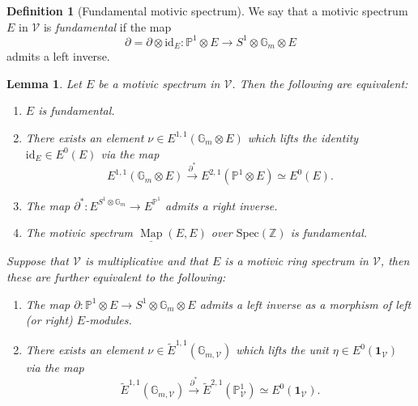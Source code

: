 \documentclass{amsart}
\theoremstyle{plain}
\newtheorem{lemma}[theorem]{Lemma}
\theoremstyle{definition}
\newtheorem{definition}[theorem]{Definition}
\theoremstyle{remark}
\numberwithin{equation}{theorem}
\newcommand{\mbb}[1]{\mathbb{#1}}
\newcommand{\mbf}[1]{\mathbf{#1}}
\newcommand{\Spec}{\mathrm{Spec}}
\newcommand{\V}{\mathcal{V}}
\newcommand{\id}{\mathrm{id}}
\newcommand{\Map}{\operatorname{Map}}
\newcommand{\intMap}{\underline{\Map}}
\begin{document}
\begin{definition}[Fundamental motivic spectrum]\label{def:FMS}
We say that a motivic spectrum $E$ in $\V$ is \textit{fundamental} if the map
\[
	\partial=\partial\otimes\id_E \colon \mbb{P}^1\otimes E \to S^1\otimes\mbb{G}_m\otimes E
\]
admits a left inverse.
\end{definition}

\begin{lemma}\label{lem:FMS}
Let $E$ be a motivic spectrum in $\V$.
Then the following are equivalent:
\begin{enumerate}
\item $E$ is fundamental.
\item There exists an element $\nu\in E^{1,1}(\mbb{G}_m\otimes E)$ which lifts the identity $\id_E\in E^0(E)$ via the map
\[
	E^{1,1}(\mbb{G}_m\otimes E) \xrightarrow{\partial^*} E^{2,1}(\mbb{P}^1\otimes E) \simeq E^0(E).
\]
\item The map $\partial^*\colon E^{S^1\otimes\mbb{G}_m}\to E^{\mbb{P}^1}$ admits a right inverse.
\item The motivic spectrum $\intMap(E,E)$ over $\Spec(\mbb{Z})$ is fundamental.
\end{enumerate}
Suppose that $\V$ is multiplicative and that $E$ is a motivic ring spectrum in $\V$, then these are further equivalent to the following:
\begin{enumerate}[resume]
\item The map $\partial\colon\mbb{P}^1\otimes E\to S^1\otimes\mbb{G}_m\otimes E$ admits a left inverse as a morphism of left (or right) $E$-modules.
\item There exists an element $\nu\in\tilde{E}^{1,1}(\mbb{G}_{m,\V})$ which lifts the unit $\eta\in E^0(\mbf{1}_\V)$ via the map
\[
	\tilde{E}^{1,1}(\mbb{G}_{m,\V}) \xrightarrow{\partial^*} \tilde{E}^{2,1}(\mbb{P}^1_\V) \simeq E^0(\mbf{1}_\V).
\]
\end{enumerate}
\end{lemma}
\end{document}
